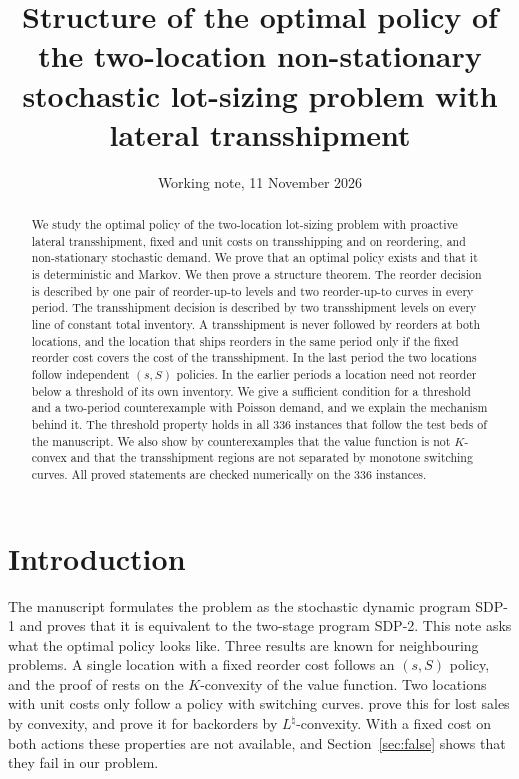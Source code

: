 \documentclass[11pt]{article}
\title{Structure of the optimal policy of the two-location non-stationary stochastic lot-sizing problem with lateral transshipment}
\author{Working note, 11 November 2026}
\date{}
\theoremstyle{definition}
\begin{document}
\maketitle

\begin{abstract}
\noindent We study the optimal policy of the two-location lot-sizing problem with proactive lateral transshipment, fixed and unit costs on transshipping and on reordering, and non-stationary stochastic demand. We prove that an optimal policy exists and that it is deterministic and Markov. We then prove a structure theorem. The reorder decision is described by one pair of reorder-up-to levels and two reorder-up-to curves in every period. The transshipment decision is described by two transshipment levels on every line of constant total inventory. A transshipment is never followed by reorders at both locations, and the location that ships reorders in the same period only if the fixed reorder cost covers the cost of the transshipment. In the last period the two locations follow independent $(s,S)$ policies. In the earlier periods a location need not reorder below a threshold of its own inventory. We give a sufficient condition for a threshold and a two-period counterexample with Poisson demand, and we explain the mechanism behind it. The threshold property holds in all 336 instances that follow the test beds of the manuscript. We also show by counterexamples that the value function is not $K$-convex and that the transshipment regions are not separated by monotone switching curves. All proved statements are checked numerically on the 336 instances.
\end{abstract}

\section{Introduction}

The manuscript formulates the problem as the stochastic dynamic program SDP-1 and proves that it is equivalent to the two-stage program SDP-2. This note asks what the optimal policy looks like. Three results are known for neighbouring problems. A single location with a fixed reorder cost follows an $(s,S)$ policy, and the proof of \citet{scarf1959optimality} rests on the $K$-convexity of the value function. Two locations with unit costs only follow a policy with switching curves. \citet{abouee2015optimal} prove this for lost sales by convexity, and \citet{xu2023optimal} prove it for backorders by $L^{\natural}$-convexity. With a fixed cost on both actions these properties are not available, and Section~\ref{sec:false} shows that they fail in our problem.
\end{document}
